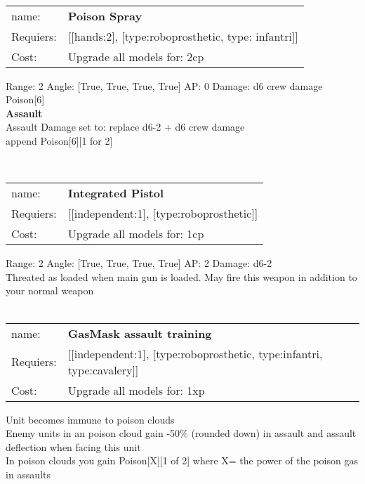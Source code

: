 \ \\
\begin{tabular}{ll}
name: & {\bf Poison Spray } \\
Requiers: & [[hands:2], [type:roboprosthetic, type: infantri]] \\
Cost: & Upgrade all models for: 2cp \\
\end{tabular}



Range: 2  Angle: [True, True, True, True] AP: 0 Damage: d6 crew damage \\
Poison[6]\\ 



{\bf Assault} \ \\
Assault Damage set to: replace d6-2 + d6 crew damage
\\ 

append Poison[6][1 for 2]


\ \\
\begin{tabular}{ll}
name: & {\bf Integrated Pistol } \\
Requiers: & [[independent:1], [type:roboprosthetic]] \\
Cost: & Upgrade all models for: 1cp \\
\end{tabular}



Range: 2  Angle: [True, True, True, True] AP: 2 Damage: d6-2 \\
Threated as loaded when main gun is loaded. May fire this weapon in addition to your normal weapon\\ 








\ \\
\begin{tabular}{ll}
name: & {\bf GasMask assault training } \\
Requiers: & [[independent:1], [type:roboprosthetic, type:infantri, type:cavalery]] \\
Cost: & Upgrade all models for: 1xp \\
\end{tabular}

Unit becomes immune to poison clouds\\ 
Enemy units in an poison cloud gain -50\% (rounded down) in assault and assault deflection when facing this unit\\ 
In poison clouds you gain Poison[X][1 of 2] where X= the power of the poison gas in assaults\\ 









